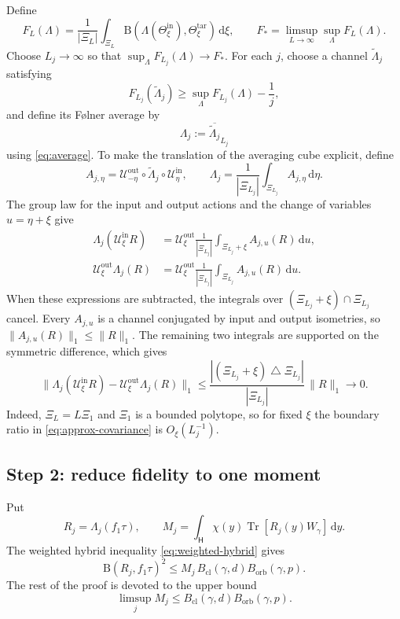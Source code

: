\documentclass[11pt]{article}
\newcommand{\Hc}{\mathsf H}
\newcommand{\Tr}{\operatorname{Tr}}
\newcommand{\dd}{\,\mathrm d}
\newcommand{\B}{\mathrm B}
\newcommand{\Bcl}{B_{\mathrm{cl}}}
\newcommand{\Borb}{B_{\mathrm{orb}}}
\begin{document}
Define
\[
  F_L(\Lambda)
  =\frac1{|\Xi_L|}\int_{\Xi_L}
   \B\!\left(\Lambda(\Theta_\xi^{\mathrm{in}}),
             \Theta_\xi^{\mathrm{tar}}\right)\dd\xi,
  \qquad
  F_*=\limsup_{L\to\infty}\sup_\Lambda F_L(\Lambda).
\]
Choose $L_j\to\infty$ so that
$\sup_\Lambda F_{L_j}(\Lambda)\to F_*$.  For each $j$, choose a channel
$\widetilde\Lambda_j$ satisfying
\[
  F_{L_j}(\widetilde\Lambda_j)
  \geq \sup_\Lambda F_{L_j}(\Lambda)-\frac1j,
\]
and define its F\o lner average by
\[
  \Lambda_j
  :=\overline{\widetilde\Lambda_j}_{L_j}
\]
using \eqref{eq:average}.  To make the translation of the averaging cube
explicit, define
\[
  A_{j,\eta}
  =\mathcal U_{-\eta}^{\mathrm{out}}\circ
   \widetilde\Lambda_j\circ\mathcal U_\eta^{\mathrm{in}},
  \qquad
  \Lambda_j
  =\frac1{|\Xi_{L_j}|}\int_{\Xi_{L_j}}A_{j,\eta}\dd\eta.
\]
The group law for the input and output actions and the change of variables
$u=\eta+\xi$ give
\[
\begin{aligned}
  \Lambda_j(\mathcal U_\xi^{\mathrm{in}}R)
  &=\mathcal U_\xi^{\mathrm{out}}
    \frac1{|\Xi_{L_j}|}
    \int_{\Xi_{L_j}+\xi}A_{j,u}(R)\dd u,\\
  \mathcal U_\xi^{\mathrm{out}}\Lambda_j(R)
  &=\mathcal U_\xi^{\mathrm{out}}
    \frac1{|\Xi_{L_j}|}
    \int_{\Xi_{L_j}}A_{j,u}(R)\dd u.
\end{aligned}
\]
When these expressions are subtracted, the integrals over
$(\Xi_{L_j}+\xi)\cap\Xi_{L_j}$ cancel.  Every $A_{j,u}$ is a channel
conjugated by input and output isometries, so
\(\|A_{j,u}(R)\|_1\leq\|R\|_1\).  The remaining two integrals are supported
on the symmetric difference, which gives
\begin{equation}\label{eq:approx-covariance}
  \|\Lambda_j(\mathcal U_\xi^{\mathrm{in}}R)
  -\mathcal U_\xi^{\mathrm{out}}\Lambda_j(R)\|_1
  \leq
  \frac{|(\Xi_{L_j}+\xi)\mathbin\triangle\Xi_{L_j}|}
       {|\Xi_{L_j}|}\,\|R\|_1
  \longrightarrow0.
\end{equation}
Indeed, \(\Xi_L=L\Xi_1\) and \(\Xi_1\) is a bounded polytope, so for fixed
\(\xi\) the boundary ratio in \eqref{eq:approx-covariance} is
\(O_\xi(L_j^{-1})\).

\subsection*{Step 2: reduce fidelity to one moment}

Put
\[
  R_j=\Lambda_j(f_1\tau),
  \qquad
  M_j=\int_{\Hc}\chi(y)\Tr[R_j(y)W_\gamma]\dd y.
\]
The weighted hybrid inequality \eqref{eq:weighted-hybrid} gives
\begin{equation}\label{eq:B-to-M}
  \B(R_j,f_1\tau)^2
  \leq M_j\,\Bcl(\gamma,d)\Borb(\gamma,p).
\end{equation}
The rest of the proof is devoted to the upper bound
\begin{equation}\label{eq:M-goal}
  \limsup_j M_j
  \leq\Bcl(\gamma,d)\Borb(\gamma,p).
\end{equation}
\end{document}
